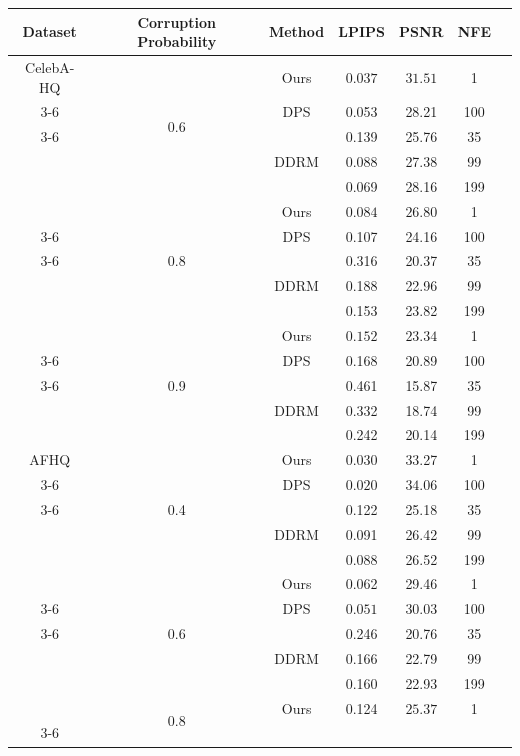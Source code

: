\documentclass{article}
\begin{document}
\begin{table}[!htp]
\centering
\begin{tabular}{@{}cc|ccccc@{}}
\toprule
\textbf{Dataset} & \textbf{Corruption Probability} & \textbf{Method} & \textbf{LPIPS} & \textbf{PSNR} & \textbf{NFE} \\ \midrule
CelebA-HQ 
& \multirow{5}{*}{0.6} & Ours & $\bm{0.037}$ & $\bm{31.51}$ & 1\\ \cline{3-6}
&  & DPS & 0.053 & 28.21 & 100 \\ \cline{3-6}
&  & \multirow{3}{*}{DDRM} & 0.139 & 25.76 & 35\\
&  &  & 0.088 & 27.38 & 99\\
&  &  & 0.069 & 28.16 & 199\\
\hline
& \multirow{5}{*}{0.8} & Ours & $\bm{0.084}$ & $\bm{26.80}$ & 1\\ \cline{3-6}
&  & DPS & 0.107 & 24.16 & 100 \\ \cline{3-6}
&  & \multirow{3}{*}{DDRM} & 0.316 & 20.37 & 35\\
&  &  & 0.188 & 22.96 & 99\\
&  &  & 0.153 & 23.82 & 199\\
\hline
& \multirow{5}{*}{0.9} & Ours & $\bm{0.152}$ & $\bm{23.34}$ & 1\\ \cline{3-6}
&  & DPS & 0.168 & 20.89 & 100 \\ \cline{3-6}
&  & \multirow{3}{*}{DDRM} & 0.461 & 15.87 & 35\\
&  &  & 0.332 & 18.74 & 99\\
&  &  & 0.242 & 20.14 & 199\\
\hline \midrule
AFHQ 
& \multirow{5}{*}{0.4} & Ours & 0.030 & 33.27 & 1\\ \cline{3-6}
&  & DPS & $\bm{0.020}$ & $\bm{34.06}$ & 100\\ \cline{3-6}
&  & \multirow{3}{*}{DDRM} & 0.122 & 25.18 & 35 \\
&  &  & 0.091 & 26.42 & 99 \\
&  &  & 0.088 & 26.52 & 199 \\
\hline
& \multirow{5}{*}{0.6} & Ours & 0.062 & 29.46 & 1\\ \cline{3-6}
&  & DPS & $\bm{0.051}$ & $\bm{30.03}$ & 100\\ \cline{3-6}
&  & \multirow{3}{*}{DDRM} & 0.246 & 20.76 & 35\\ 
&  &  & 0.166 & 22.79 & 99\\ 
&  &  & 0.160 & 22.93 & 199\\ 
\hline 
& \multirow{5}{*}{0.8} & Ours & 0.124 & $\bm{25.37}$ & 1\\ \cline{3-6}

\end{tabular}
\end{table}
\end{document}
